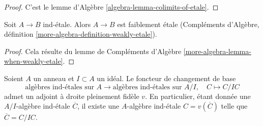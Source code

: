 \begin{proof}
C'est le lemme d'Algèbre \ref{algebra-lemma-colimits-of-etale}.
\end{proof}

\begin{lemma}
\label{lemma-ind-etale-implies}
Soit $A \to B$ ind-\'etale. Alors $A \to B$ est faiblement \'etale
(Compléments d'Algèbre, définition \ref{more-algebra-definition-weakly-etale}).
\end{lemma}

\begin{proof}
Cela résulte du lemme de Compléments d'Algèbre
\ref{more-algebra-lemma-when-weakly-etale}.
\end{proof}

\begin{lemma}
\label{lemma-lift-ind-etale}
Soient $A$ un anneau et $I \subset A$ un idéal. Le foncteur de changement de base
$$
\text{algèbres ind-\'etales sur }A\text{}
\longrightarrow
\text{algèbres ind-\'etales sur }A/I\text{},\quad
C \longmapsto C/IC
$$
admet un adjoint à droite pleinement fidèle $v$. En particulier, étant donnée
une $A/I$-algèbre ind-\'etale $\overline{C}$, il existe
une $A$-algèbre ind-\'etale $C = v(\overline{C})$ telle que
$\overline{C} = C/IC$.
\end{lemma}

